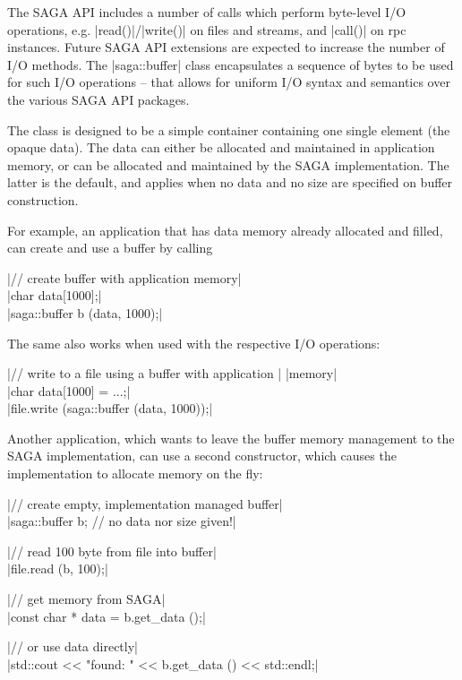  
 The SAGA API includes a number of calls which perform
 byte-level I/O operations, e.g. |read()|/|write()| on files and
 streams, and |call()| on rpc instances.  Future SAGA API
 extensions are expected to increase the number of I/O methods.
 The |saga::buffer| class encapsulates a sequence of bytes to be
 used for such I/O operations -- that allows for uniform I/O
 syntax and semantics over the various SAGA API packages.
 
 The class is designed to be a simple container containing one
 single element (the opaque data).  The data can either be
 allocated and maintained in application memory, or can be
 allocated and maintained by the SAGA implementation.  The
 latter is the default, and applies when no data and no size are
 specified on buffer construction.
 
 For example, an application that has data memory already
 allocated and filled, can create and use a buffer by calling
 
   \shift |// create buffer with application memory|\\
   \shift |char data[1000];|\\
   \shift |saga::buffer b (data, 1000);|
 
 The same also works when used with the respective I/O
 operations:
 
   \shift |// write to a file using a buffer with application |
          |memory|\\
   \shift |char data[1000] = ...;|\\
   \shift |file.write (saga::buffer (data, 1000));|
 
 Another application, which wants to leave the buffer memory
 management to the SAGA implementation, can use a second
 constructor, which causes the implementation to allocate memory
 on the fly:
 
   \shift |// create empty, implementation managed buffer|\\
   \shift |saga::buffer b;  // no data nor size given!|
 
   \shift |// read 100 byte from file into buffer|\\
   \shift |file.read (b, 100);|
 
   \shift |// get memory from SAGA|\\
   \shift |const char * data = b.get_data ();|
 
   \shift |// or use data directly|\\
   \shift |std::cout << "found: " << b.get_data () << std::endl;|
 
